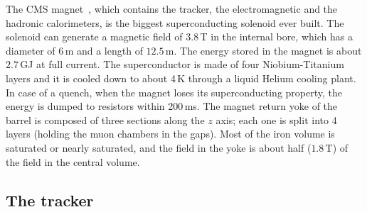 The CMS magnet~\cite{CMSmagnet}, which contains the tracker, the electromagnetic and the hadronic calorimeters, is the biggest superconducting solenoid ever built. The solenoid can generate a magnetic field of $3.8$\,T in the internal bore, which has a diameter of 6\,m and a length of $12.5$\,m. The energy stored in the magnet is about $2.7$\,GJ at full current. The superconductor is made of four Niobium-Titanium layers and it is cooled down to about 4\,K through a liquid Helium cooling plant. In case of a quench, when the magnet loses its superconducting property, the energy is dumped to resistors within 200\,ms. The magnet return yoke of the barrel is composed of three sections along the $z$ axis; each one is split into 4 layers (holding the muon chambers in the gaps). Most of the iron volume is saturated or nearly saturated, and the field in the yoke is about half ($1.8$\,T) of the field in the central volume.

\subsection{The tracker}

